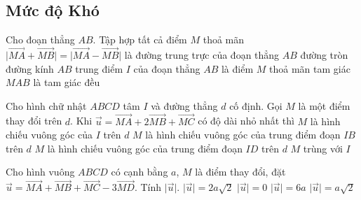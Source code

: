 \subsection*{Mức độ Khó}
\begin{ex}%
	Cho đoạn thẳng $AB$. Tập hợp tất cả điểm $M$ thoả mãn $\Big|\vec{MA}+\vec{MB}\Big|=\Big|\vec{MA}-\vec{MB}\Big|$ là
	\choice
	{đường trung trực của đoạn thẳng $AB$}
	{\True đường tròn đường kính $AB$}
	{trung điểm $I$ của đoạn thẳng $AB$}
	{là điểm $M$ thoả mãn tam giác $MAB$ là tam giác đều}
\end{ex}

\begin{ex}%
	Cho hình chữ nhật $ABCD$ tâm $I$ và đường thẳng $d$ cố định. Gọi $M$ là một điểm thay đổi trên $d$. Khi $\vec{u}=\vec{MA}+2\vec{MB}+\vec{MC}$ có độ dài nhỏ nhất thì
	\choice
	{$M$ là hình chiếu vuông góc của $I$ trên $d$}
	{\True $M$ là hình chiếu vuông góc của trung điểm đoạn $IB$ trên $d$}
	{$M$ là hình chiếu vuông góc của trung điểm đoạn $ID$ trên $d$}
	{$M$ trùng với $I$}
\end{ex}

\begin{ex}%
	Cho hình vuông $ABCD$ có cạnh bằng $a$, $M$ là điểm thay đổi, đặt $\vec{u}=\vec{MA}+\vec{MB}+\vec{MC}-3\vec{MD}.$ Tính $\big|\vec{u}\big|$.
	\choice
	{\True $\big|\vec{u}\big|=2a\sqrt{2}$}
	{$\big|\vec{u}\big|=0$}
	{$\big|\vec{u}\big|=6a$}
	{$\big|\vec{u}\big|=a\sqrt{2}$}
\end{ex}

